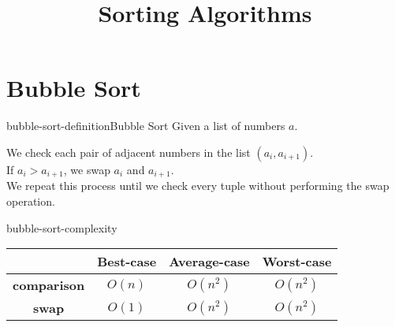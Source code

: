 \documentclass[preview]{standalone}
\begin{document}
\title{Sorting Algorithms}
\genpage

\section{Bubble Sort}

\begin{snippetdefinition}{bubble-sort-definition}{Bubble Sort}
    Given a list of numbers \(a\).

    We check each pair of adjacent numbers in the list \((a_i,a_{i+1})\).\\
    If \(a_i>a_{i+1}\), we swap \(a_i\) and \(a_{i+1}\).\\
    We repeat this process until we check every tuple without performing the swap operation.
\end{snippetdefinition}

\begin{snippet}{bubble-sort-complexity}
    \def\arraystretch{1.5}
    \begin{center}
        \begin{tabular}{ |c|c|c|c| }
            \hline
            & \textbf{Best-case} & \textbf{Average-case} &\textbf{Worst-case} \\
            \hline
            \textbf{comparison} & \(O(n)\) & \(O(n^2)\) & \(O(n^2)\) \\ 
            \hline
            \textbf{swap} & \(O(1)\) & \(O(n^2)\) & \(O(n^2)\) \\ 
            \hline
        \end{tabular}
    \end{center}
    \vspace{0.5cm}
\end{snippet}

\end{document}
